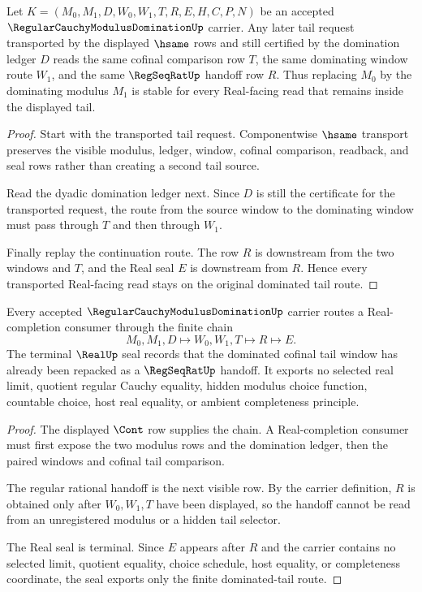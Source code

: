 \begin{theorem}
\label{thm:regular-cauchy-modulus-domination-tail-stability}
Let $K=(M_0,M_1,D,W_0,W_1,T,R,E,H,C,P,N)$ be an accepted $\RegularCauchyModulusDominationUp$ carrier. Any later tail request transported by the displayed $\hsame$ rows and still certified by the domination ledger $D$ reads the same cofinal comparison row $T$, the same dominating window route $W_1$, and the same $\RegSeqRatUp$ handoff row $R$. Thus replacing $M_0$ by the dominating modulus $M_1$ is stable for every Real-facing read that remains inside the displayed tail.
\end{theorem}
\begin{proof}
Start with the transported tail request. Componentwise $\hsame$ transport preserves the visible modulus, ledger, window, cofinal comparison, readback, and seal rows rather than creating a second tail source.

Read the dyadic domination ledger next. Since $D$ is still the certificate for the transported request, the route from the source window to the dominating window must pass through $T$ and then through $W_1$.

Finally replay the continuation route. The row $R$ is downstream from the two windows and $T$, and the Real seal $E$ is downstream from $R$. Hence every transported Real-facing read stays on the original dominated tail route.
\end{proof}

\begin{theorem}
\label{thm:regular-cauchy-modulus-domination-real-seal-route}
Every accepted $\RegularCauchyModulusDominationUp$ carrier routes a Real-completion consumer through the finite chain
$$
M_0,M_1,D \longmapsto W_0,W_1,T \longmapsto R \longmapsto E .
$$
The terminal $\RealUp$ seal records that the dominated cofinal tail window has already been repacked as a $\RegSeqRatUp$ handoff. It exports no selected real limit, quotient regular Cauchy equality, hidden modulus choice function, countable choice, host real equality, or ambient completeness principle.
\end{theorem}
\begin{proof}
The displayed $\Cont$ row supplies the chain. A Real-completion consumer must first expose the two modulus rows and the domination ledger, then the paired windows and cofinal tail comparison.

The regular rational handoff is the next visible row. By the carrier definition, $R$ is obtained only after $W_0,W_1,T$ have been displayed, so the handoff cannot be read from an unregistered modulus or a hidden tail selector.

The Real seal is terminal. Since $E$ appears after $R$ and the carrier contains no selected limit, quotient equality, choice schedule, host equality, or completeness coordinate, the seal exports only the finite dominated-tail route.
\end{proof}

